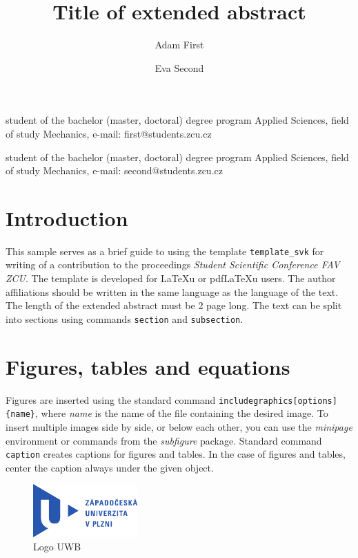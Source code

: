 \documentclass{template_svk}
\def\mtt#1{{\footnotesize\tt#1}}
\def\comm#1{\mtt{\char92#1}}
\begin{document}
\title{Title of extended abstract}

 \author{Adam First}{student of the bachelor (master, doctoral)
   degree program Applied Sciences, field of study Mechanics, e-mail: first@students.zcu.cz}

 \author{Eva Second}{student of the bachelor (master, doctoral)
   degree program Applied Sciences, field of study Mechanics, e-mail: second@students.zcu.cz}

\maketitle

\section{Introduction}

This sample serves as a brief guide to using the template {\tt template\_svk} for
writing of a contribution to the proceedings {\em Student Scientific Conference FAV ZCU}. The template is developed for \LaTeX{}u or pdf\LaTeX{}u users. The author affiliations should be written in the same language as the language of the text. The length of the extended abstract must be 2 page long. The text can be split into sections using commands \comm{section} and \comm{subsection}. 

\section{Figures, tables and equations}

Figures are inserted using the standard command \comm{includegraphics}{\footnotesize\verb|[options]{name}|}, where {\it name} is
the name of the file containing the desired image. To insert multiple images side by side, or below each other, you can use the {\it minipage} environment or commands from the {\it subfigure} package. Standard command \comm{caption} creates captions for figures and tables. In the case of figures and tables, center the caption always under the given object.

\begin{figure}[!ht]
  \centering
  \includegraphics[width=40mm]{logozcu}
  \caption{Logo UWB}\label{F1}
\end{figure}
\end{document}
